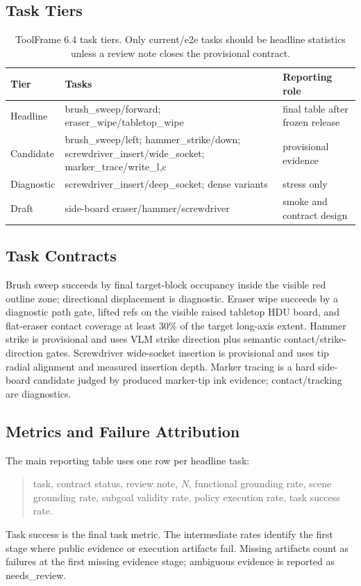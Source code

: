 \documentclass[journal]{IEEEtran}
\begin{document}
\subsection{Task Tiers}
\begin{table}[t]
\centering
\caption{ToolFrame 6.4 task tiers. Only current/e2e tasks should be headline
statistics unless a review note closes the provisional contract.}
\begin{tabular}{p{}p{}p{}}
\toprule
Tier & Tasks & Reporting role \\
\midrule
Headline & brush\_sweep/forward; eraser\_wipe/tabletop\_wipe & final table after frozen release \\
Candidate & brush\_sweep/left; hammer\_strike/down; screwdriver\_insert/wide\_socket; marker\_trace/write\_l,c & provisional evidence \\
Diagnostic & screwdriver\_insert/deep\_socket; dense variants & stress only \\
Draft & side-board eraser/hammer/screwdriver & smoke and contract design \\
\bottomrule
\end{tabular}
\end{table}

\subsection{Task Contracts}
Brush sweep succeeds by final target-block occupancy inside the visible red
outline zone; directional displacement is diagnostic. Eraser wipe succeeds by a
diagnostic path gate, lifted refs on the visible raised tabletop HDU board, and
flat-eraser contact coverage at least 30\% of the target long-axis extent.
Hammer strike is provisional and uses VLM strike direction plus semantic
contact/strike-direction gates.
Screwdriver wide-socket insertion is provisional and uses tip radial alignment
and measured insertion depth. Marker tracing is a hard side-board candidate
judged by produced marker-tip ink evidence; contact/tracking are diagnostics.

\subsection{Metrics and Failure Attribution}
The main reporting table uses one row per headline task:
\begin{quote}
task, contract status, review note, $N$, functional grounding rate, scene
grounding rate, subgoal validity rate, policy execution rate, task success rate.
\end{quote}
Task success is the final task metric. The intermediate rates identify the
first stage where public evidence or execution artifacts fail. Missing
artifacts count as failures at the first missing evidence stage; ambiguous
evidence is reported as needs\_review.
\end{document}
